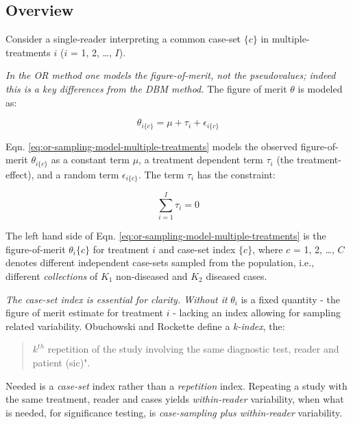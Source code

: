 \documentclass[
]{book}
\begin{document}
\hypertarget{or-method-intro-single-reader-overview}{%
\subsection{Overview}\label{or-method-intro-single-reader-overview}}

Consider a single-reader interpreting a common case-set \(\{c\}\) in multiple-treatments \(i\) (\(i\) = 1, 2, \ldots, \(I\)).

\emph{In the OR method one models the figure-of-merit, not the pseudovalues; indeed this is a key differences from the DBM method.} The figure of merit \(\theta\) is modeled as:

\begin{equation}
\theta_{i\{c\}}=\mu+\tau_i+\epsilon_{i\{c\}}
\label{eq:or-sampling-model-multiple-treatments}
\end{equation}

Eqn. \eqref{eq:or-sampling-model-multiple-treatments} models the observed figure-of-merit \(\theta_{i\{c\}}\) as a constant term \(\mu\), a treatment dependent term \(\tau_i\) (the treatment-effect), and a random term \(\epsilon_{i\{c\}}\). The term \(\tau_i\) has the constraint:

\begin{equation}
\sum_{i=1}^{I}\tau_i=0
\label{eq:ConstraintTau}
\end{equation}

The left hand side of Eqn. \eqref{eq:or-sampling-model-multiple-treatments} is the figure-of-merit \(\theta_i\{c\}\) for treatment \(i\) and case-set index \(\{c\}\), where \(c\) = 1, 2, \ldots, \(C\) denotes different independent case-sets sampled from the population, i.e., different \emph{collections} of \(K_1\) non-diseased and \(K_2\) diseased cases.

\emph{The case-set index is essential for clarity. Without it} \(\theta_i\) is a fixed quantity - the figure of merit estimate for treatment \(i\) - lacking an index allowing for sampling related variability. Obuchowski and Rockette define a \emph{k-index}, the:

\begin{quote}
\(k^{th}\) repetition of the study involving the same diagnostic test, reader and patient (sic)".
\end{quote}

Needed is a \emph{case-set} index rather than a \emph{repetition} index. Repeating a study with the same treatment, reader and cases yields \emph{within-reader} variability, when what is needed, for significance testing, is \emph{case-sampling plus within-reader} variability.
\end{document}
